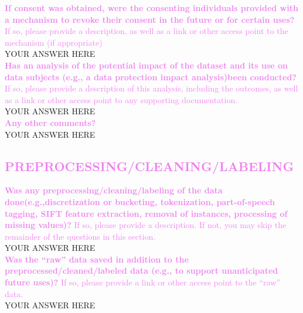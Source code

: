 \documentclass[letterpaper, 10 pt, conference]{ieeeconf}  %
\newcommand{\sectioncolor}{violet}
\begin{document}
    \textcolor{\sectioncolor}{\textbf{
    If consent was obtained, were the consenting individuals provided with a
    mechanism to revoke their consent in the future or for certain uses?
    }
     If so, please provide a description, as well as a link or other access
     point to the mechanism (if appropriate)
    } \\
    YOUR ANSWER HERE \\
    
    \textcolor{\sectioncolor}{\textbf{
    Has an analysis of the potential impact of the dataset and its use on data
    subjects (e.g., a data protection impact analysis)been conducted?
    }
    If so, please provide a description of this analysis, including the
    outcomes, as well as a link or other access point to any supporting
    documentation.
    } \\
    YOUR ANSWER HERE \\
    
    \textcolor{\sectioncolor}{\textbf{
    Any other comments?
    }} \\
    YOUR ANSWER HERE \\

\begin{mdframed}[linecolor=\sectioncolor]
\section*{\textcolor{\sectioncolor}{
    PREPROCESSING/CLEANING/LABELING
}}
\end{mdframed}

    \textcolor{\sectioncolor}{\textbf{
    Was any preprocessing/cleaning/labeling of the data
    done(e.g.,discretization or bucketing, tokenization, part-of-speech
    tagging, SIFT feature extraction, removal of instances, processing of
    missing values)?
    }
    If so, please provide a description. If not, you may skip the remainder of
    the questions in this section.
    } \\
    YOUR ANSWER HERE \\

    \textcolor{\sectioncolor}{\textbf{
    Was the “raw” data saved in addition to the preprocessed/cleaned/labeled
    data (e.g., to support unanticipated future uses)?
    }
    If so, please provide a link or other access point to the “raw” data.
    } \\
    YOUR ANSWER HERE \\
\end{document}
